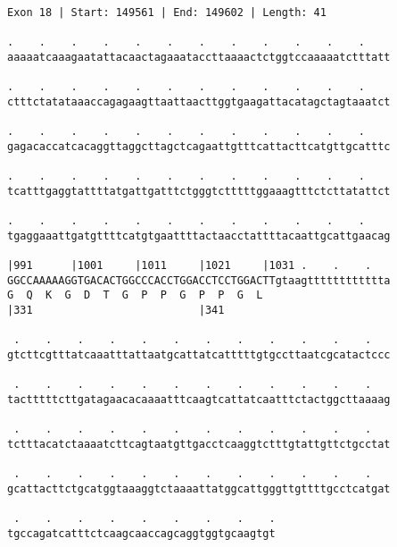 \documentclass{article}
\begin{document}
\begin{Verbatim}
Exon 18 | Start: 149561 | End: 149602 | Length: 41
 
.    .    .    .    .    .    .    .    .    .    .    .    
aaaaatcaaagaatattacaactagaaataccttaaaactctggtccaaaaatctttatt
  
.    .    .    .    .    .    .    .    .    .    .    .    
ctttctatataaaccagagaagttaattaacttggtgaagattacatagctagtaaatct
  
.    .    .    .    .    .    .    .    .    .    .    .    
gagacaccatcacaggttaggcttagctcagaattgtttcattacttcatgttgcatttc
  
.    .    .    .    .    .    .    .    .    .    .    .    
tcatttgaggtattttatgattgatttctgggtctttttggaaagtttctcttatattct
  
.    .    .    .    .    .    .    .    .    .    .    .    
tgaggaaattgatgttttcatgtgaattttactaacctattttacaattgcattgaacag
  
|991      |1001     |1011     |1021     |1031 .    .    .   
GGCCAAAAAGGTGACACTGGCCCACCTGGACCTCCTGGACTTgtaagtttttttttttta
G  Q  K  G  D  T  G  P  P  G  P  P  G  L                    
|331                          |341                          
  
 .    .    .    .    .    .    .    .    .    .    .    .   
gtcttcgtttatcaaatttattaatgcattatcatttttgtgccttaatcgcatactccc
  
 .    .    .    .    .    .    .    .    .    .    .    .   
tactttttcttgatagaacacaaaatttcaagtcattatcaatttctactggcttaaaag
  
 .    .    .    .    .    .    .    .    .    .    .    .   
tctttacatctaaaatcttcagtaatgttgacctcaaggtctttgtattgttctgcctat
  
 .    .    .    .    .    .    .    .    .    .    .    .   
gcattacttctgcatggtaaaggtctaaaattatggcattgggttgttttgcctcatgat
  
 .    .    .    .    .    .    .    .    .
tgccagatcatttctcaagcaaccagcaggtggtgcaagtgt
\end{Verbatim}
\newpage
\end{document}

